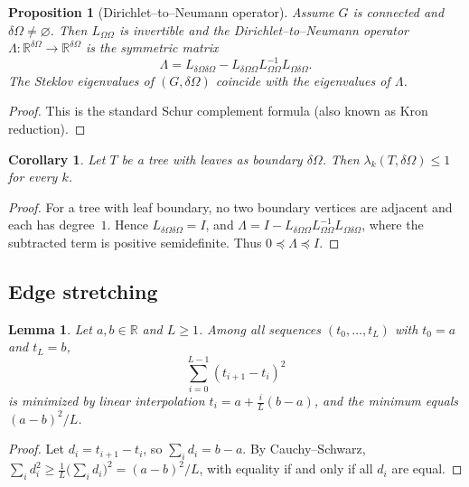 \documentclass[11pt]{article}
\newtheorem{lemma}[theorem]{Lemma}
\newtheorem{proposition}[theorem]{Proposition}
\newtheorem{corollary}[theorem]{Corollary}
\theoremstyle{definition}
\theoremstyle{remark}
\newcommand{\RR}{\mathbb{R}}
\newcommand{\dO}{\delta\Omega}
\newcommand{\Om}{\Omega}
\begin{document}
\begin{proposition}[Dirichlet--to--Neumann operator]\label{prop:schur}
Assume $G$ is connected and $\dO\neq\varnothing$.
Then $L_{\Om\Om}$ is invertible and the Dirichlet--to--Neumann operator $\Lambda:\RR^{\dO}\to\RR^{\dO}$ is the symmetric matrix
\begin{equation}\label{eq:schur}
\Lambda=L_{\dO\dO}-L_{\dO\Om}L_{\Om\Om}^{-1}L_{\Om\dO}.
\end{equation}
The Steklov eigenvalues of $(G,\dO)$ coincide with the eigenvalues of $\Lambda$.
\end{proposition}

\begin{proof}
This is the standard Schur complement formula (also known as Kron reduction).
\end{proof}

\begin{corollary}\label{cor:leq1}
Let $T$ be a tree with leaves as boundary $\dO$.
Then $\lambda_k(T,\dO)\le 1$ for every $k$.
\end{corollary}

\begin{proof}
For a tree with leaf boundary, no two boundary vertices are adjacent and each has degree~$1$.
Hence $L_{\dO\dO}=I$, and $\Lambda=I-L_{\dO\Om}L_{\Om\Om}^{-1}L_{\Om\dO}$, where the subtracted term is positive semidefinite.
Thus $0\preceq\Lambda\preceq I$.
\end{proof}


\subsection{Edge stretching}\label{subsec:stretch}

\begin{lemma}\label{lem:path}
Let $a,b\in\RR$ and $L\ge 1$.
Among all sequences $(t_0,\dots,t_L)$ with $t_0=a$ and $t_L=b$,
\[
\sum_{i=0}^{L-1}(t_{i+1}-t_i)^2
\]
is minimized by linear interpolation $t_i=a+\frac{i}{L}(b-a)$, and the minimum equals $(a-b)^2/L$.
\end{lemma}

\begin{proof}
Let $d_i=t_{i+1}-t_i$, so $\sum_i d_i=b-a$.
By Cauchy--Schwarz, $\sum_i d_i^2\ge \frac{1}{L}\bigl(\sum_i d_i\bigr)^2=(a-b)^2/L$, with equality if and only if all $d_i$ are equal.
\end{proof}
\end{document}
